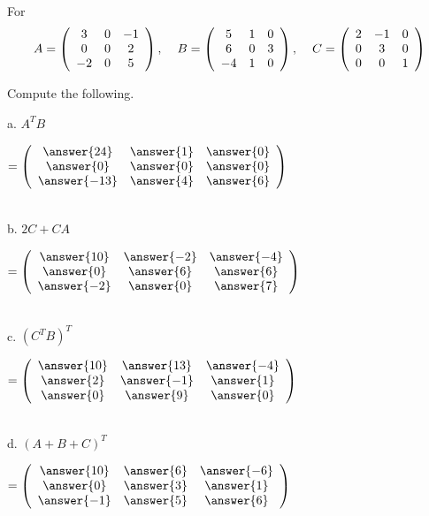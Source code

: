 \documentclass{ximera}
\begin{document}
\begin{exercise}

For
\begin{equation*}
A = \left(\begin{array}{ccc}
3 & 0 & -1\\
0 & 0 & 2\\
-2 & 0 & 5
\end{array}\right), \hspace{.4cm}
B = \left(\begin{array}{ccc}
5 & 1 & 0\\
6 & 0 & 3\\
-4 & 1 & 0
\end{array}\right), \hspace{.4cm}
C = \left(\begin{array}{ccc}
2 & -1 & 0\\
0 & 3 & 0 \\
0 & 0 & 1
\end{array}\right)
\end{equation*}

Compute the following.

a. $A^{T} B $ \begin{prompt}$ = \left(\begin{array}{ccc}
\answer{24} & \answer{1} & \answer{0}\\
\answer{0} & \answer{0} & \answer{0}\\
\answer{-13} & \answer{4} & \answer{6}
\end{array}\right)$
\end{prompt}\\

b. $2C + CA$ \begin{prompt} $ = \left(\begin{array}{ccc}
\answer{10} & \answer{-2} & \answer{-4}\\
\answer{0} & \answer{6} & \answer{6}\\
\answer{-2} & \answer{0} & \answer{7}
\end{array}\right)$
\end{prompt}\\

c. $\left(C^{T}B\right)^{T}$ \begin{prompt} $ = \left(\begin{array}{ccc}
\answer{10} & \answer{13} & \answer{-4}\\
\answer{2} & \answer{-1} & \answer{1}\\
\answer{0} & \answer{9} & \answer{0}
\end{array}\right)$
\end{prompt}\\

d. $\left(A + B + C\right)^{T} $ \begin{prompt} $ = \left(\begin{array}{ccc}
\answer{10} & \answer{6} & \answer{-6}\\
\answer{0} & \answer{3} & \answer{1}\\
\answer{-1} & \answer{5} & \answer{6}
\end{array}\right)$
\end{prompt}
\end{exercise}
\end{document}
